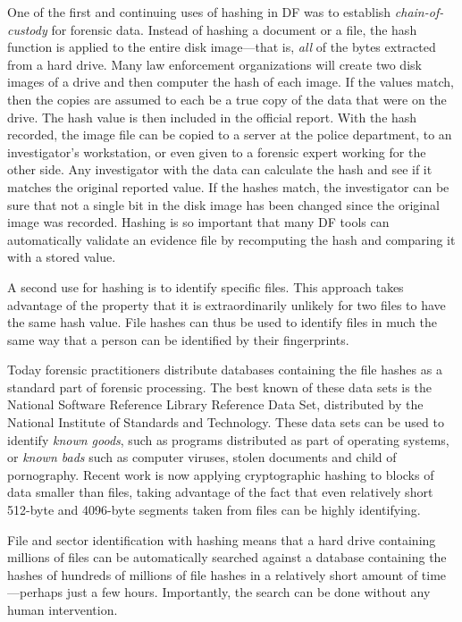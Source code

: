 One of the first and continuing uses of hashing in DF was to establish
\emph{chain-of-custody} for forensic data. Instead of hashing a
document or a file, the hash function is applied to the entire disk
image---that is, \emph{all} of the bytes extracted from a hard
drive. Many law enforcement organizations will create two
disk images of a drive and then computer the hash of each image.  If the values match, then the
copies are assumed to each be a true copy of the data that were on the
drive. The hash value is then included in the official report. With
the hash recorded, the image file can be copied to a server at the
police department, to an investigator's workstation, or even given to
a forensic expert working for the other side. Any investigator with the
data can calculate the hash and see if it matches the original
reported value. If the hashes match, the investigator can be sure that
not a single bit in the disk image has been changed since the original
image was recorded. Hashing is so important that many DF tools can
automatically validate an evidence file by recomputing the hash and
comparing it with a stored value.

A second use for hashing is to identify specific
files. This approach takes advantage of the property that it is
extraordinarily unlikely for two files to have the same
hash value. File hashes can thus be used to identify files in much the
same way that a person can be identified by their fingerprints. 

Today forensic practitioners distribute databases containing the file
hashes as a standard part of forensic processing. The best known of these data
sets is the National Software Reference Library Reference Data Set,
distributed by the National Institute of Standards and
Technology\cite{nist-nsrl-rds-march2012}. These data sets can be used
to identify \emph{known goods}, such as programs distributed as part
of operating systems, or \emph{known bads} such as computer viruses,
stolen documents and child of pornography. Recent work is now
applying cryptographic hashing to blocks of data smaller than
files\cite{garfinkel:sector-id}, taking advantage of the fact that
even relatively short 512-byte and 4096-byte segments taken from
files can be highly identifying. 

File and sector identification with hashing means that a hard drive
containing millions of files can be automatically searched against a
database containing the hashes of hundreds of millions of file hashes
in a relatively short amount of time---perhaps just a few hours. Importantly, the search can be done without any human
intervention.



